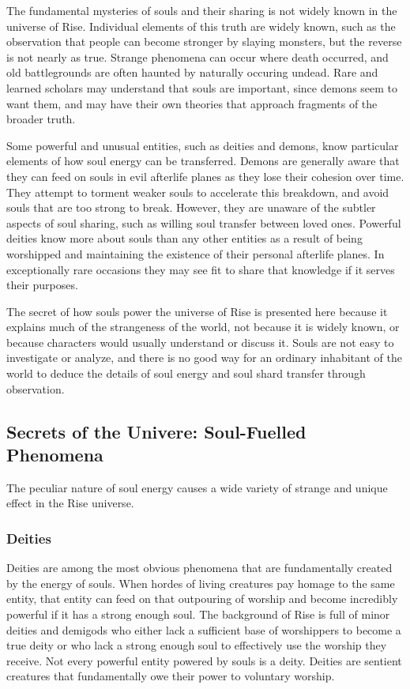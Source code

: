             The fundamental mysteries of souls and their sharing is not widely known in the universe of Rise.
            Individual elements of this truth are widely known, such as the observation that people can become stronger by slaying monsters, but the reverse is not nearly as true.
            Strange phenomena can occur where death occurred, and old battlegrounds are often haunted by naturally occuring undead.
            Rare and learned scholars may understand that souls are important, since demons seem to want them, and may have their own theories that approach fragments of the broader truth.

            Some powerful and unusual entities, such as deities and demons, know particular elements of how soul energy can be transferred.
            Demons are generally aware that they can feed on souls in evil afterlife planes as they lose their cohesion over time.
            They attempt to torment weaker souls to accelerate this breakdown, and avoid souls that are too strong to break.
            However, they are unaware of the subtler aspects of soul sharing, such as willing soul transfer between loved ones.
            Powerful deities know more about souls than any other entities as a result of being worshipped and maintaining the existence of their personal afterlife planes.
            In exceptionally rare occasions they may see fit to share that knowledge if it serves their purposes.

            The secret of how souls power the universe of Rise is presented here because it explains much of the strangeness of the world, not because it is widely known, or because characters would usually understand or discuss it.
            Souls are not easy to investigate or analyze, and there is no good way for an ordinary inhabitant of the world to deduce the details of soul energy and soul shard transfer through observation.

    \subsection{Secrets of the Univere: Soul-Fuelled Phenomena}

        The peculiar nature of soul energy causes a wide variety of strange and unique effect in the Rise universe.

        \subsubsection{Deities}
            Deities are among the most obvious phenomena that are fundamentally created by the energy of souls.
            When hordes of living creatures pay homage to the same entity, that entity can feed on that outpouring of worship and become incredibly powerful if it has a strong enough soul.
            The background of Rise is full of minor deities and demigods who either lack a sufficient base of worshippers to become a true deity or who lack a strong enough soul to effectively use the worship they receive.
            Not every powerful entity powered by souls is a deity.
            Deities are sentient creatures that fundamentally owe their power to voluntary worship.


